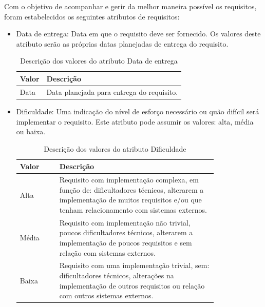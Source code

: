 Com o objetivo de acompanhar e gerir da melhor maneira possível os requisitos, foram estabelecidos os seguintes atributos de requisitos:
\begin{itemize}
\item Data de entrega:
Data em que o requisito deve ser fornecido. Os valores deste atributo serão as próprias datas planejadas de entrega do requisito.

\begin{table}[h]
\centering
\caption{Descrição dos valores do atributo Data de entrega}
\label{Rotulo}
\begin{tabular}{|l|l|}
\hline
\textbf{Valor} & \textbf{Descrição} \\
\hline
Data & Data planejada para entrega do requisito. \\ \hline
\end{tabular}
\end{table}

\item Dificuldade:
Uma indicação do nível de esforço necessário ou quão difícil será implementar o requisito. Este atributo pode assumir os valores: alta, média ou baixa.

\begin{table}[h]
\centering
\caption{Descrição dos valores do atributo Dificuldade}
\label{Rotulo}
\begin{tabular}{ | l | p{0.8\linewidth} | }
\hline
\textbf{Valor} & \textbf{Descrição} \\ \hline
Alta  &  Requisito com implementação complexa, em função de: dificultadores técnicos, alterarem a implementação de muitos requisitos e/ou que tenham relacionamento com sistemas externos. \\ \hline
Média & Requisito com implementação não trivial, poucos dificultadores técnicos, alterarem a implementação de poucos requisitos e sem relação com sistemas externos. \\ \hline
Baixa & Requisito com uma implementação trivial, sem: dificultadores técnicos, alterações na implementação de outros requisitos ou relação com outros sistemas externos. \\ \hline
\end{tabular}
\end{table}



\end{itemize}
